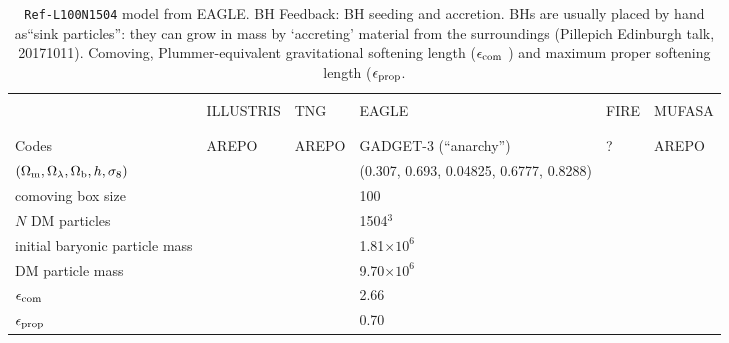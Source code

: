 \documentclass[11pt,a4paper]{article}
\begin{document}
\begin{landscape}
  \begin{table}[]
    \centering
 \begin{tabular}{l  lllll}
      \hline
      \hline
      &                    &  &&& \\
      & ILLUSTRIS    & TNG  & EAGLE & FIRE & MUFASA\\
      &                     &  &&& \\
      \hline
      &                     &  &&&\\
      Codes                                                                                                 & AREPO           & AREPO               & GADGET-3 (``{\sc anarchy}'')             & ?           &  AREPO\\
      $(\Omega_{\rm m},  \Omega_{\lambda}, \Omega_{\rm b}, h, \sigma_{8})$ &                      &                         &   (0.307, 0.693, 0.04825, 0.6777, 0.8288) & & \\ 

      comoving box size                &                     &   & 100 &&\\
      $N$ DM particles                  &                      &   &  1504$^3$ &&\\
     initial baryonic particle mass &                     &    & 1.81$\times10^{6}$  &&\\
     DM particle mass                    &                     &    & 9.70$\times10^{6}$  &&\\
    $\epsilon_{\rm com}$                 &                      &   & 2.66 &&\\
    $\epsilon_{\rm prop}$                 &                     &    & 0.70 &&\\
    \hline
    \hline
\end{tabular}
    \caption{
      {\tt Ref-L100N1504} model from EAGLE.
BH Feedback: BH seeding and accretion.  
      BHs are usually placed by hand as``sink particles'':
      they can grow in mass by `accreting' material from the surroundings
      (Pillepich Edinburgh talk, 20171011).  
      Comoving, Plummer-equivalent gravitational softening length ($\epsilon_{\rm com}$ ) 
      and maximum proper softening length ($\epsilon_{\rm prop}$. 
    }
    \label{tab:previous_surveys}
\end{table}
\end{landscape}
\end{document}
